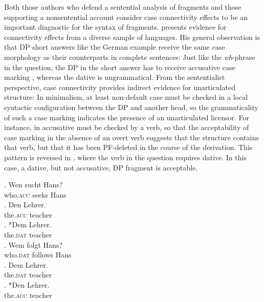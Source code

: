 Both those authors who defend a sentential analysis of fragments and those supporting a nonsentential account consider case connectivity effects to be an important diagnostic for the syntax of fragments. \citet[676--679]{merchant2004} presents evidence for connectivity effects from a diverse sample of languages. His general observation is that DP short answers like the German example \Next receive the same case morphology as their counterparts in complete sentences: Just like the \textit{wh}-phrase in the question, the DP in the short answer has to receive accusative case marking \Next[a], whereas the dative \Next[b] is ungrammatical. From the sententialist perspective, case connectivity provides indirect evidence for unarticulated structure: In minimalism, at least non-default case must be checked in a local syntactic configuration between the DP and another head, so the grammaticality of such a case marking indicates the presence of an unarticulated licensor. For instance, in \Next[a] accusative must be checked by a verb, so that the acceptability of case marking in the absence of an overt verb suggests that the structure contains that verb, but that it has been PF-deleted in the course of the derivation. This pattern is reversed in \NNext, where the verb in the question requires dative. In this case, a dative, but not accusative, DP fragment is acceptable.

\exg. Wen sucht Hans?\label{ex:merchant.caseconn-acc}\\
who.\textsc{acc} seeks Hans\\
 \hfill {}
\ag. Den Lehrer.\label{ex:merchant.caseconn-acc-subex}\\ 
the.\textsc{acc} teacher \mbox{}\\
\bg. *Dem Lehrer.\\
the.\textsc{dat} teacher\\

\exg. Wem folgt Hans?\label{ex:merchant.caseconn-dat}\\
who.\textsc{dat} follows Hans\\
 \hfill {}
\ag. Dem Lehrer. \label{ex:merchant.caseconn-dat-subex}\\ 
the.\textsc{dat} teacher\\
\bg. *Den Lehrer.\\
the.\textsc{acc} teacher\\

